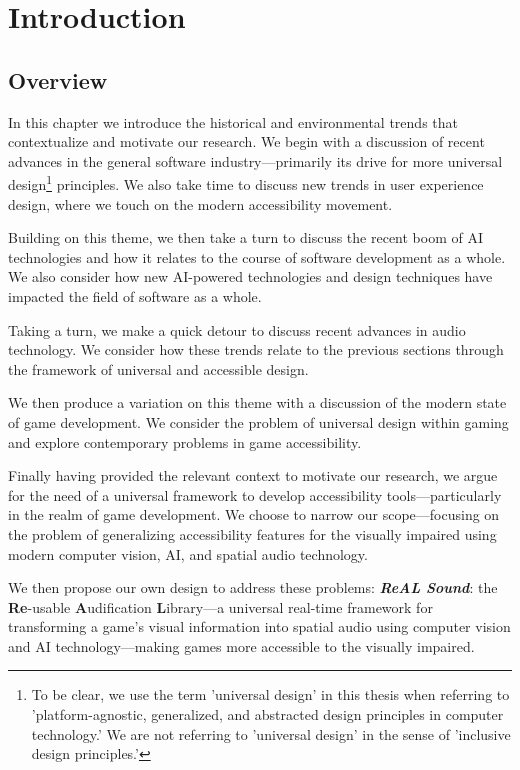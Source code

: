 \documentclass{report}
\newcommand{\rs}{ReAL Sound\xspace}
\newcommand{\rsfull}{\textbf{Re}-usable \textbf{A}udification \textbf{L}ibrary\xspace}
\begin{document}
\tableofcontents{} %
\newpage{} %



\chapter{Introduction}

\section{Overview}
In this chapter we introduce the historical and environmental trends that contextualize and motivate our research. We begin with a discussion of recent advances in the general software industry---primarily its drive for more universal design\footnote{To be clear, we use the term 'universal design' in this thesis when referring to 'platform-agnostic, generalized, and abstracted design principles in computer technology.' We are not referring to 'universal design' in the sense of 'inclusive design principles.'} principles. We also take time to discuss new trends in user experience design, where we touch on the modern accessibility movement.

Building on this theme, we then take a turn to discuss the recent boom of AI technologies and how it relates to the course of software development as a whole. We also consider how new AI-powered technologies and design techniques have impacted the field of software as a whole.

Taking a turn, we make a quick detour to discuss recent advances in audio technology. We consider how these trends relate to the previous sections through the framework of universal and accessible design.

We then produce a variation on this theme with a discussion of the modern state of game development. We consider the problem of universal design within gaming and explore contemporary problems in game accessibility. 

Finally having provided the relevant context to motivate our research, we argue for the need of a universal framework to develop accessibility tools---particularly in the realm of game development. We choose to narrow our scope---focusing on the problem of generalizing accessibility features for the visually impaired using modern computer vision, AI, and spatial audio technology. 

We then propose our own design to address these problems: \emph{\textbf{\rs}}: the \rsfull---a universal real-time framework for transforming a game's visual information into spatial audio using computer vision and AI technology---making games more accessible to the visually impaired.    
\end{document}

